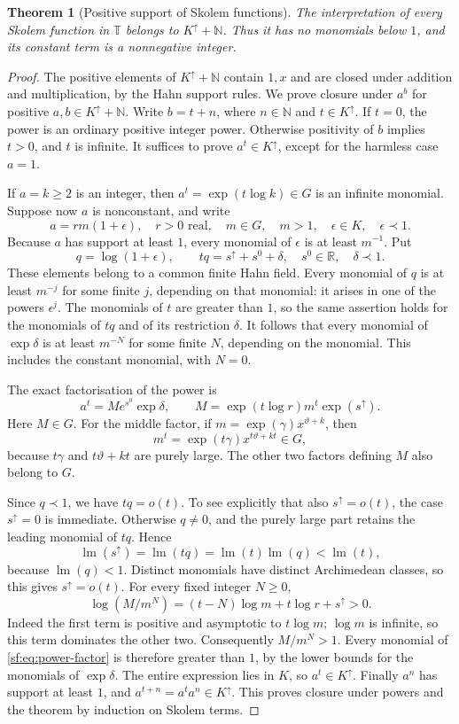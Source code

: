 \documentclass[11pt]{article}
\newtheorem{theorem}{Theorem}[section]
\theoremstyle{definition}
\theoremstyle{remark}
\newcommand{\N}{\mathbb N}
\newcommand{\R}{\mathbb R}
\newcommand{\T}{\mathbb T}
\newcommand{\up}{\uparrow}
\newcommand{\lm}{\operatorname{lm}}
\numberwithin{equation}{section}
\begin{document}
\begin{theorem}[Positive support of Skolem functions]\label{sf:thm:Sk-support}
The interpretation of every Skolem function in $\T$ belongs to
$K^\up+\N$. Thus it has no monomials below $1$, and its
constant term is a nonnegative integer.
\end{theorem}
\begin{proof}
The positive elements of $K^\up+\N$ contain $1,x$ and are
closed under addition and multiplication, by the Hahn support
rules. We prove closure under $a^b$ for positive
$a,b\in K^\up+\N$. Write $b=t+n$, where $n\in\N$ and
$t\in K^\up$. If $t=0$, the power is an ordinary positive
integer power. Otherwise positivity of $b$ implies $t>0$, and
$t$ is infinite. It suffices to prove $a^t\in K^\up$, except
for the harmless case $a=1$.

If $a=k\ge2$ is an integer, then
$a^t=\exp(t\log k)\in G$ is an infinite monomial. Suppose now
$a$ is nonconstant, and write
\[
 a=r m(1+\epsilon),\quad r>0\text{ real},\quad m\in G,
 \quad m>1,\quad\epsilon\in K,\quad\epsilon\prec1.
\]
Because $a$ has support at least $1$, every monomial of
$\epsilon$ is at least $m^{-1}$. Put
\[
 q=\log(1+\epsilon),\qquad tq=s^\up+s^0+\delta,
 \quad s^0\in\R,\quad\delta\prec1.
\]
These elements belong to a common finite Hahn field. Every monomial
of $q$ is at least $m^{-j}$ for some finite $j$, depending on that
monomial: it arises in one of the powers $\epsilon^j$.
The monomials of $t$ are greater than $1$, so the same assertion
holds for the monomials of $tq$ and of its restriction $\delta$.
It follows that every monomial of $\exp\delta$ is at least
$m^{-N}$ for some finite $N$, depending on the monomial. This
includes the constant monomial, with $N=0$.

The exact factorisation of the power is
\begin{equation}
 a^t=M e^{s^0}\exp\delta,\qquad
 M=\exp(t\log r)m^t\exp(s^\up).\label{sf:eq:power-factor}
\end{equation}
Here $M\in G$. For the middle factor, if
$m=\exp(\gamma)x^{\vartheta+k}$, then
\[
 m^t=\exp(t\gamma)x^{t\vartheta+kt}\in G,
\]
because $t\gamma$ and $t\vartheta+kt$ are purely large.
The other two factors defining $M$ also belong to $G$.

Since $q\prec1$, we have $tq=o(t)$. To see explicitly that
also $s^\up=o(t)$, the case $s^\up=0$ is immediate.
Otherwise $q\ne0$, and the purely large part retains the leading
monomial of $tq$. Hence
\[
 \lm(s^\up)=\lm(tq)=\lm(t)\lm(q)<\lm(t),
\]
because $\lm(q)<1$. Distinct monomials have distinct
Archimedean classes, so this gives $s^\up=o(t)$.
For every fixed integer $N\ge0$,
\[
 \log(M/m^N)
    =(t-N)\log m+t\log r+s^\up>0.
\]
Indeed the first term is positive and asymptotic to $t\log m$;
$\log m$ is infinite, so this term dominates the other two.
Consequently $M/m^N>1$. Every monomial of
\eqref{sf:eq:power-factor} is therefore greater than $1$, by the
lower bounds for the monomials of $\exp\delta$. The entire
expression lies in $K$, so $a^t\in K^\up$. Finally $a^n$ has
support at least $1$, and $a^{t+n}=a^t a^n\in K^\up$.
This proves closure under powers and the theorem by induction on
Skolem terms.
\end{proof}
\end{document}
